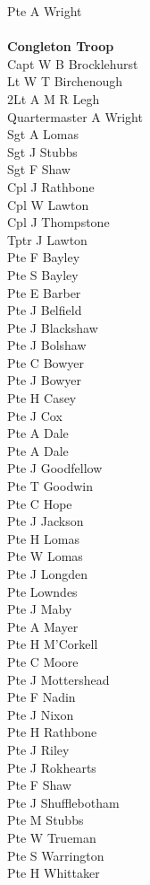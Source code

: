 \begin{multicols}{3}
  Pte A Wright \\
  \\
  \textbf{Congleton Troop} \\
  Capt W B Brocklehurst \\
  Lt W T Birchenough \\
  2Lt A M R Legh \\
  Quartermaster A Wright \\
  Sgt A Lomas \\
  Sgt J Stubbs \\
  Sgt F Shaw \\
  Cpl J Rathbone \\
  Cpl W Lawton \\
  Cpl J Thompstone \\
  Tptr J Lawton \\
  Pte F Bayley \\
  Pte S Bayley \\
  Pte E Barber \\
  Pte J Belfield \\
  Pte J Blackshaw \\
  Pte J Bolshaw \\
  Pte C Bowyer \\
  Pte J Bowyer \\
  Pte H Casey \\
  Pte J Cox \\
  Pte A Dale \\
  Pte A Dale \\
  Pte J Goodfellow \\
  Pte T Goodwin \\
  Pte C Hope \\
  Pte J Jackson \\
  Pte H Lomas \\
  Pte W Lomas \\
  Pte J Longden \\
  Pte Lowndes \\
  Pte J Maby \\
  Pte A Mayer \\
  Pte H M'Corkell \\
  Pte C Moore \\
  Pte J Mottershead \\
  Pte F Nadin \\
  Pte J Nixon \\
  Pte H Rathbone \\
  Pte J Riley \\
  Pte J Rokhearts \\
  Pte F Shaw \\
  Pte J Shufflebotham \\
  Pte M Stubbs \\
  Pte W Trueman \\
  Pte S Warrington \\
  Pte H Whittaker \\
\end{multicols}
